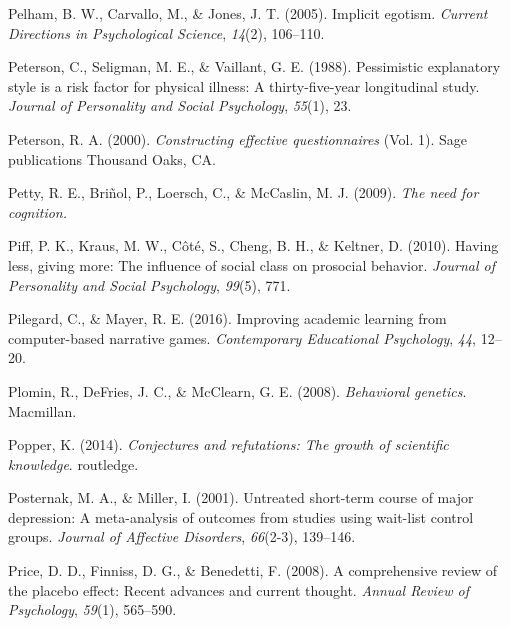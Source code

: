 \documentclass[
]{krantz}
\newlength{\cslhangindent}
\newlength{\cslentryspacingunit} %
\newenvironment{CSLReferences}[2] %
 {%
  \setlength{\parindent}{0pt}
  \ifodd #1
  \let\oldpar\par
  \def\par{\hangindent=\cslhangindent\oldpar}
  \fi
  \setlength{\parskip}{#2\cslentryspacingunit}
 }%
 {}
\begin{document}
\begin{CSLReferences}{1}{0}
\leavevmode{}%
Pelham, B. W., Carvallo, M., \& Jones, J. T. (2005). Implicit egotism. \emph{Current Directions in Psychological Science}, \emph{14}(2), 106--110.

\leavevmode{}%
Peterson, C., Seligman, M. E., \& Vaillant, G. E. (1988). Pessimistic explanatory style is a risk factor for physical illness: A thirty-five-year longitudinal study. \emph{Journal of Personality and Social Psychology}, \emph{55}(1), 23.

\leavevmode{}%
Peterson, R. A. (2000). \emph{Constructing effective questionnaires} (Vol. 1). Sage publications Thousand Oaks, CA.

\leavevmode{}%
Petty, R. E., Briñol, P., Loersch, C., \& McCaslin, M. J. (2009). \emph{The need for cognition.}

\leavevmode{}%
Piff, P. K., Kraus, M. W., Côté, S., Cheng, B. H., \& Keltner, D. (2010). Having less, giving more: The influence of social class on prosocial behavior. \emph{Journal of Personality and Social Psychology}, \emph{99}(5), 771.

\leavevmode{}%
Pilegard, C., \& Mayer, R. E. (2016). Improving academic learning from computer-based narrative games. \emph{Contemporary Educational Psychology}, \emph{44}, 12--20.

\leavevmode{}%
Plomin, R., DeFries, J. C., \& McClearn, G. E. (2008). \emph{Behavioral genetics}. Macmillan.

\leavevmode{}%
Popper, K. (2014). \emph{Conjectures and refutations: The growth of scientific knowledge}. routledge.

\leavevmode{}%
Posternak, M. A., \& Miller, I. (2001). Untreated short-term course of major depression: A meta-analysis of outcomes from studies using wait-list control groups. \emph{Journal of Affective Disorders}, \emph{66}(2-3), 139--146.

\leavevmode{}%
Price, D. D., Finniss, D. G., \& Benedetti, F. (2008). A comprehensive review of the placebo effect: Recent advances and current thought. \emph{Annual Review of Psychology}, \emph{59}(1), 565--590.


\end{CSLReferences}
\end{document}
